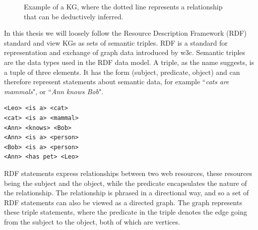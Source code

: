 \begin{figure}[htbp]
\centering
{}

\caption[Simple visual example of a KG.]{Example of a KG, where the dotted line represents a relationship that can be deductively inferred.} \label{fig:KGexample}
\end{figure}

In this thesis we will loosely follow the Resource Description Framework (RDF) standard and view KGs as sets of semantic triples. RDF is a standard for representation and exchange of graph data introduced by \gls{w3c}. Semantic triples are the data types used in the RDF data model. A triple, as the name suggests, is a tuple of three elements. It has the form (subject, predicate, object) and can therefore represent statements about semantic data, for example ``\textit{cats are mammals}", or ``\textit{Ann knows Bob}". 
\begin{lstlisting}[caption={Example of RDF triple set written in informal pseudocode.}, label={RDF_triples_example}]
<Leo> <is a> <cat>
<cat> <is a> <mammal>
<Ann> <knows> <Bob>
<Ann> <is a> <person>
<Bob> <is a> <person>
<Ann> <has pet> <Leo>
\end{lstlisting}
RDF statements express relationships between two web resources, these resources being the subject and the object, while the predicate encapsulates the nature of the relationship. The relationship is phrased in a directional way, and so a set of RDF statements can also be viewed as a directed graph. The graph represents these triple statements, where the predicate in the triple denotes the edge going from the subject to the object, both of which are vertices.

